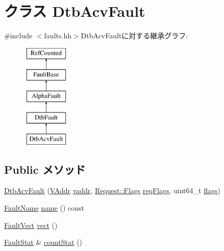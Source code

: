 \hypertarget{classAlphaISA_1_1DtbAcvFault}{
\section{クラス DtbAcvFault}
\label{classAlphaISA_1_1DtbAcvFault}
}


{\ttfamily \#include $<$faults.hh$>$}DtbAcvFaultに対する継承グラフ:\begin{figure}[H]
\begin{center}
\leavevmode
\includegraphics[height=5cm]{classAlphaISA_1_1DtbAcvFault}
\end{center}
\end{figure}
\subsection*{Public メソッド}
\begin{DoxyCompactItemize}
\item 
\hyperlink{classAlphaISA_1_1DtbAcvFault_afa7cdcdb1879c2258aa8ffd15b82c5a0}{DtbAcvFault} (\hyperlink{structAlphaISA_1_1VAddr}{VAddr} \hyperlink{classAlphaISA_1_1DtbFault_a48d5190e0fd672e7fe9d248a670b8ea3}{vaddr}, \hyperlink{classFlags}{Request::Flags} \hyperlink{classAlphaISA_1_1DtbFault_a4342a385c094b40ed46b0674fbb0b223}{reqFlags}, uint64\_\-t \hyperlink{classAlphaISA_1_1DtbFault_a899a76dc5f03f0d4ea3793c339e07ee9}{flags})
\item 
\hyperlink{sim_2faults_8hh_abb196df64725e5c2568c900cf130d8d7}{FaultName} \hyperlink{classAlphaISA_1_1DtbAcvFault_a73adb23259baf912a81683a9790a303f}{name} () const 
\item 
\hyperlink{classm5_1_1params_1_1Addr}{FaultVect} \hyperlink{classAlphaISA_1_1DtbAcvFault_ae15c5d7ab0162821b93d668d0b225198}{vect} ()
\item 
\hyperlink{classStats_1_1Scalar}{FaultStat} \& \hyperlink{classAlphaISA_1_1DtbAcvFault_a6c79663c761ff57265459f7e3aefaf4c}{countStat} ()
\end{DoxyCompactItemize}
